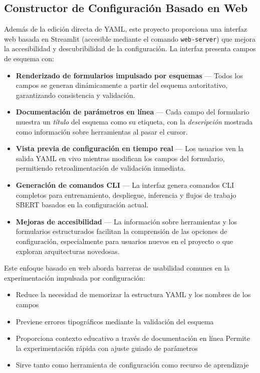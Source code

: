 \documentclass[11pt,a4paper]{article}
\begin{document}
\subsection{Constructor de Configuración Basado en Web}

Además de la edición directa de YAML, este proyecto proporciona una interfaz web basada en Streamlit (accesible mediante el comando \texttt{web-server}) que mejora la accesibilidad y descubribilidad de la configuración. La interfaz presenta campos de esquema con:

\begin{itemize}[leftmargin=*]
    \item \textbf{Renderizado de formularios impulsado por esquemas} --- Todos los campos se generan dinámicamente a partir del esquema autoritativo, garantizando consistencia y validación.
    \item \textbf{Documentación de parámetros en línea} --- Cada campo del formulario muestra un \emph{título} del esquema como su etiqueta, con la \emph{descripción} mostrada como información sobre herramientas al pasar el cursor.
    \item \textbf{Vista previa de configuración en tiempo real} --- Los usuarios ven la salida YAML en vivo mientras modifican los campos del formulario, permitiendo retroalimentación de validación inmediata.
    \item \textbf{Generación de comandos CLI} --- La interfaz genera comandos CLI completos para entrenamiento, despliegue, inferencia y flujos de trabajo SBERT basados en la configuración actual.
    \item \textbf{Mejoras de accesibilidad} --- La información sobre herramientas y los formularios estructurados facilitan la comprensión de las opciones de configuración, especialmente para usuarios nuevos en el proyecto o que exploran arquitecturas novedosas.
\end{itemize}

Este enfoque basado en web aborda barreras de usabilidad comunes en la experimentación impulsada por configuración:
\begin{itemize}[leftmargin=*]
    \item Reduce la necesidad de memorizar la estructura YAML y los nombres de los campos
    \item Previene errores tipográficos mediante la validación del esquema
    \item Proporciona contexto educativo a través de documentación en línea
    \uta Permite la experimentación rápida con ajuste guiado de parámetros
    \item Sirve tanto como herramienta de configuración como recurso de aprendizaje
\end{itemize}
\end{document}
